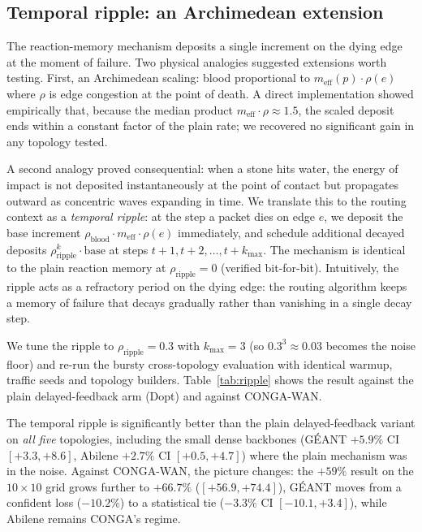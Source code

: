 \subsection{Temporal ripple: an Archimedean extension}
\label{subsec:ripple}

The reaction-memory mechanism deposits a single increment on the
dying edge at the moment of failure. Two physical analogies suggested
extensions worth testing. First, an Archimedean scaling: blood
proportional to $m_{\mathrm{eff}}(p) \cdot \rho(e)$ where $\rho$ is
edge congestion at the point of death. A direct implementation
showed empirically that, because the median product
$m_{\mathrm{eff}} \cdot \rho \approx 1.5$, the scaled deposit ends
within a constant factor of the plain rate; we recovered no
significant gain in any topology tested.

A second analogy proved consequential: when a stone hits water, the
energy of impact is not deposited instantaneously at the point of
contact but propagates outward as concentric waves expanding in
time. We translate this to the routing context as a \emph{temporal
ripple}: at the step a packet dies on edge $e$, we deposit the base
increment $\rho_{\mathrm{blood}} \cdot m_{\mathrm{eff}} \cdot
\rho(e)$ immediately, and schedule additional decayed deposits
$\rho_{\mathrm{ripple}}^k \cdot \mathrm{base}$ at steps
$t+1, t+2, \ldots, t+k_{\max}$. The mechanism is identical to the
plain reaction memory at $\rho_{\mathrm{ripple}}=0$ (verified
bit-for-bit). Intuitively, the ripple acts as a refractory period
on the dying edge: the routing algorithm keeps a memory of failure
that decays gradually rather than vanishing in a single decay step.


We tune the ripple to $\rho_{\mathrm{ripple}}=0.3$ with
$k_{\max}=3$ (so $0.3^3 \approx 0.03$ becomes the noise floor) and
re-run the bursty cross-topology evaluation with identical
warmup, traffic seeds and topology builders.
Table~\ref{tab:ripple} shows the result against the plain
delayed-feedback arm (Dopt) and against CONGA-WAN.



The temporal ripple is significantly better than the plain
delayed-feedback variant on \emph{all five} topologies, including
the small dense backbones (GÉANT $+5.9\%$ CI $[+3.3, +8.6]$,
Abilene $+2.7\%$ CI $[+0.5, +4.7]$) where the plain mechanism was
in the noise. Against CONGA-WAN, the picture changes: the
$+59\%$ result on the $10\times 10$ grid grows further to
$+66.7\%$ ($[+56.9, +74.4]$), GÉANT moves from a confident loss
($-10.2\%$) to a statistical tie ($-3.3\%$ CI $[-10.1, +3.4]$),
while Abilene remains CONGA's regime.



